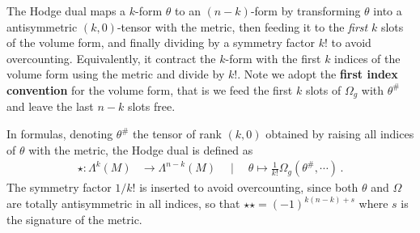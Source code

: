 \documentclass[../geometry_main.tex]{subfiles}
\begin{document}
\begin{mytheorem}
%
The Hodge dual maps a $k$-form $\theta$ to an $(n-k)$-form by transforming $\theta$ into a antisymmetric $(k,0)$-tensor with the metric, then feeding it to the \emph{first} $k$ slots of the volume form, and finally dividing by a symmetry factor $k!$ to avoid overcounting.
Equivalently, it contract the $k$-form with the first $k$ indices of the volume form using the metric and divide by $k!$.
Note we adopt the \textbf{first index convention} for the volume form, that is we feed the first $k$ slots of $\Omega_g$ with $\theta^{\#}$ and leave the last $n-k$ slots free.

In formulas, denoting \(\theta^{\#}\) the tensor of rank $(k,0)$ obtained by raising all indices of $\theta$ with the metric, the Hodge dual is defined as
\begin{align}
    \star: \Lambda^k (M) &\to \Lambda^{n-k} (M) \quad \mid \quad \theta \mapsto \tfrac{1}{k!}\Omega_g(\theta^{\#}, \cdots)\,.
\end{align}
The symmetry factor $1/k!$ is inserted to avoid overcounting, since both $\theta$ and $\Omega$ are totally antisymmetric in all indices, so that  $\star\star = (-1)^{k(n-k)+s}$ where $s$ is the signature of the metric.


\end{mytheorem}
\end{document}
